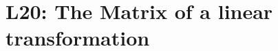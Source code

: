 \documentclass[../Main.tex]{subfiles}
\begin{document}
\chapter{L20: The Matrix of a linear transformation}
\end{document}
